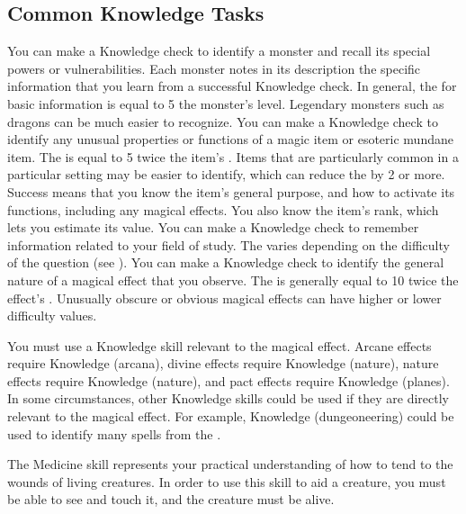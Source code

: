     \subsection{Common Knowledge Tasks}
         You can make a Knowledge check to identify a monster and recall its special powers or vulnerabilities.
        Each monster notes in its description the specific information that you learn from a successful Knowledge check.
        In general, the  for basic information is equal to 5 \add the monster's level.
        Legendary monsters such as dragons can be much easier to recognize.
         You can make a Knowledge check to identify any unusual properties or functions of a magic item or esoteric mundane item.
        The  is equal to 5 \add twice the item's .
        Items that are particularly common in a particular setting may be easier to identify, which can reduce the  by 2 or more.
        Success means that you know the item's general purpose, and how to activate its functions, including any magical effects.
        You also know the item's rank, which lets you estimate its value.
         You can make a Knowledge check to remember information related to your field of study.
        The  varies depending on the difficulty of the question (see ).
        \label{Identify Magical Effect} You can make a Knowledge check to identify the general nature of a magical effect that you observe.
        The  is generally equal to 10 \add twice the effect's .
        Unusually obscure or obvious magical effects can have higher or lower difficulty values.

        You must use a Knowledge skill relevant to the magical effect.
        Arcane effects require Knowledge (arcana), divine effects require Knowledge (nature), nature effects require Knowledge (nature), and pact effects require Knowledge (planes).
        In some circumstances, other Knowledge skills could be used if they are directly relevant to the magical effect.
        For example, Knowledge (dungeoneering) could be used to identify many spells from the  .

\newpage
{}
    The Medicine skill represents your practical understanding of how to tend to the wounds of living creatures.
    In order to use this skill to aid a creature, you must be able to see and touch it, and the creature must be alive.

